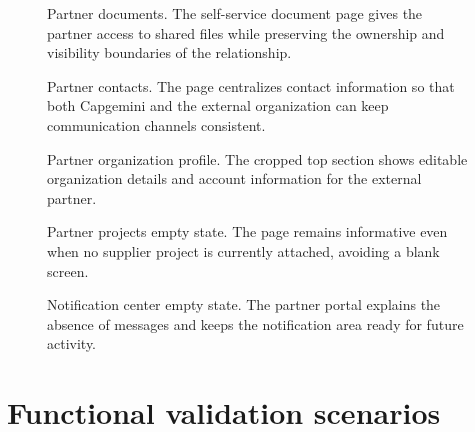 \begin{figure}[p]
  \centering
  \caption{Partner documents. The self-service document page gives the partner access to shared files while preserving the ownership and visibility boundaries of the relationship.}
  \label{fig:partner-documents-view}
\end{figure}

\begin{figure}[p]
  \centering
  \caption{Partner contacts. The page centralizes contact information so that both Capgemini and the external organization can keep communication channels consistent.}
  \label{fig:partner-contacts-view}
\end{figure}

\begin{figure}[p]
  \centering
  \caption{Partner organization profile. The cropped top section shows editable organization details and account information for the external partner.}
  \label{fig:partner-profile-view}
\end{figure}

\begin{figure}[p]
  \centering
  \caption{Partner projects empty state. The page remains informative even when no supplier project is currently attached, avoiding a blank screen.}
  \label{fig:partner-projects-view}
\end{figure}

\begin{figure}[p]
  \centering
  \caption{Notification center empty state. The partner portal explains the absence of messages and keeps the notification area ready for future activity.}
  \label{fig:partner-notifications-view}
\end{figure}

\clearpage

\section{Functional validation scenarios}

